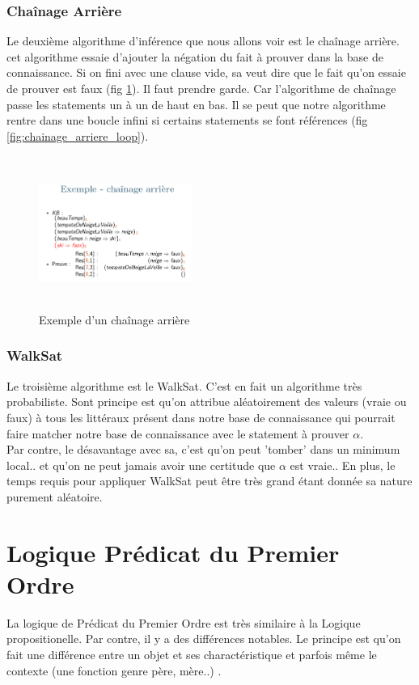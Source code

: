 \documentclass[oneside]{book}
\begin{document}
\subsubsection{Chaînage Arrière}
Le deuxième algorithme d'inférence que nous allons voir est le chaînage arrière. cet algorithme essaie d'ajouter la négation du fait à prouver dans la base de connaissance. Si on fini avec une clause vide, sa veut dire que le fait qu'on essaie de prouver est faux (fig \ref{fig:exemple_chainage_arriere}). Il faut prendre garde. Car l'algorithme de chaînage passe les statements un à un de haut en bas. Il se peut que notre algorithme rentre dans une boucle infini si certains statements se font références (fig \ref{fig:chainage_arriere_loop}).\\

\begin{figure}[h!t]
\centering
\includegraphics[width = 5cm, height = 5cm, keepaspectratio]{exemple_chainage_arriere.png}
\caption{Exemple d'un chaînage arrière}
\label{fig:exemple_chainage_arriere}
\end{figure}


\subsubsection{WalkSat}
Le troisième algorithme est le WalkSat. C'est en fait un algorithme très probabiliste. Sont principe est qu'on attribue aléatoirement des valeurs (vraie ou faux) à tous les littéraux présent dans notre base de connaissance qui pourrait faire matcher notre base de connaissance avec le statement à prouver $\alpha$. \\

Par contre, le désavantage avec sa, c'est qu'on peut 'tomber' dans un minimum local.. et qu'on ne peut jamais avoir une certitude que $\alpha$ est vraie.. En plus, le temps requis pour appliquer WalkSat peut être très grand étant donnée sa nature purement aléatoire. 

\section{Logique Prédicat du Premier Ordre}
La logique de Prédicat du Premier Ordre est très similaire à la Logique propositionelle. Par contre, il y a des différences notables. Le principe est qu'on fait une différence entre un objet et ses charactéristique et parfois même le contexte (une fonction genre père, mère..) .\\
\end{document}
